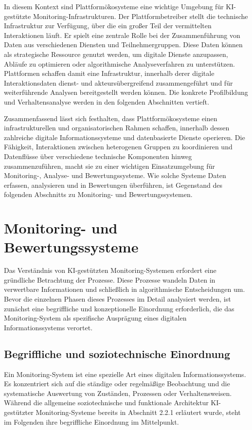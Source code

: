 In diesem Kontext sind Plattformökosysteme eine wichtige Umgebung für \ac{KI}-gestützte Monitoring-Infrastrukturen. Der Plattformbetreiber stellt die technische Infrastruktur zur Verfügung, über die ein großer Teil der vermittelten Interaktionen läuft. Er spielt eine zentrale Rolle bei der Zusammenführung von Daten aus verschiedenen Diensten und Teilnehmergruppen. Diese Daten können als strategische Ressource genutzt werden, um digitale Dienste anzupassen, Abläufe zu optimieren oder algorithmische Analyseverfahren zu unterstützen. Plattformen schaffen damit eine Infrastruktur, innerhalb derer digitale Interaktionsdaten dienst- und akteursübergreifend zusammengeführt und für weiterführende Analysen bereitgestellt werden können. Die konkrete Profilbildung und Verhaltensanalyse werden in den folgenden Abschnitten vertieft.

Zusammenfassend lässt sich festhalten, dass Plattformökosysteme einen infrastrukturellen und organisatorischen Rahmen schaffen, innerhalb dessen zahlreiche digitale Informationssysteme und datenbasierte Dienste operieren. Die Fähigkeit, Interaktionen zwischen heterogenen Gruppen zu koordinieren und Datenflüsse über verschiedene technische Komponenten hinweg zusammenzuführen, macht sie zu einer wichtigen Einsatzumgebung für Monitoring-, Analyse- und Bewertungssysteme. Wie solche Systeme Daten erfassen, analysieren und in Bewertungen überführen, ist Gegenstand des folgenden Abschnitts zu Monitoring- und Bewertungssystemen.

\section{Monitoring- und Bewertungssysteme}

Das Verständnis von \ac{KI}-gestützten Monitoring-Systemen erfordert eine gründliche Betrachtung der Prozesse. Diese Prozesse wandeln Daten in verwertbare Informationen und schließlich in algorithmische Entscheidungen um. Bevor die einzelnen Phasen dieses Prozesses im Detail analysiert werden, ist zunächst eine begriffliche und konzeptionelle Einordnung erforderlich, die das Monitoring-System als spezifische Ausprägung eines digitalen Informationssystems verortet.

\subsection{Begriffliche und soziotechnische Einordnung}

Ein Monitoring-System ist eine spezielle Art eines digitalen Informationssystems. Es konzentriert sich auf die ständige oder regelmäßige Beobachtung und die systematische Auswertung von Zuständen, Prozessen oder Verhaltensweisen. Während die allgemeine soziotechnische und funktionale Architektur KI-gestützter Monitoring-Systeme bereits in Abschnitt 2.2.1 erläutert wurde, steht im Folgenden ihre begriffliche Einordnung im Mittelpunkt.

